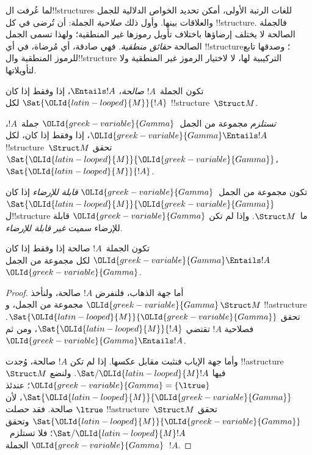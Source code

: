 \documentclass[../../../include/open-logic-section]{subfiles}
\begin{document}

\begin{explain}
لما عُرفت ال!!{structure}s للغات الرتبة الأولى، أمكن تحديد
الخواص الدلالية للجمل والعلاقات بينها. وأول ذلك \emph{صلاحية}
الجملة: أن تُرضى في كل !!{structure}. فالجملة الصالحة لا يختلف
إرضاؤها باختلاف تأويل رموزها غير المنطقية؛ ولهذا تسمى الجمل
الصالحة \emph{حقائق منطقية}. فهي صادقة، أي مُرضاة، في أي
!!{structure}؛ وصدقها تابع للرموز المنطقية وال!!{structure}
التركيبية لها، لا لاختيار الرموز غير المنطقية ولا لتأويلاتها.
\end{explain}

\begin{defn}[الصلاحية]
تكون الجملة~$!A$ \emph{صالحة}، $\Entails !A$، إذا وفقط إذا كان
$\Sat{{\OLId{latin-looped}{M}}}{!A}$ لكل !!{structure}~$\Struct M$.
\end{defn}

\begin{defn}[الاستلزام]
\emph{تستلزم} مجموعة من الجمل~${\OLId{greek-variable}{Gamma}}$ جملة~$!A$،
${\OLId{greek-variable}{Gamma}} \Entails !A$، إذا وفقط إذا كان، لكل
!!{structure}~$\Struct M$ تحقق $\Sat{{\OLId{latin-looped}{M}}}{{\OLId{greek-variable}{Gamma}}}$،
$\Sat{{\OLId{latin-looped}{M}}}{!A}$.
\end{defn}


\begin{defn}
تكون مجموعة من الجمل~${\OLId{greek-variable}{Gamma}}$ \emph{قابلة للإرضاء} إذا كان
$\Sat{{\OLId{latin-looped}{M}}}{{\OLId{greek-variable}{Gamma}}}$ ل!!{structure} ما~$\Struct M$. وإذا لم تكن
${\OLId{greek-variable}{Gamma}}$ قابلة للإرضاء سميت \emph{غير قابلة للإرضاء}.
\end{defn}

\begin{prop}
تكون الجملة~$!A$ صالحة إذا وفقط إذا كان
${\OLId{greek-variable}{Gamma}} \Entails !A$ لكل مجموعة من الجمل~${\OLId{greek-variable}{Gamma}}$.
\end{prop}

\begin{proof}
أما جهة الذهاب، فلنفرض $!A$ صالحة، ولنأخذ ${\OLId{greek-variable}{Gamma}}$ مجموعة من
الجمل، و$\Struct M$ !!a{structure} تحقق
$\Sat{{\OLId{latin-looped}{M}}}{{\OLId{greek-variable}{Gamma}}}$. فصلاحية $!A$ تقتضي $\Sat{{\OLId{latin-looped}{M}}}{!A}$،
ومن ثم ${\OLId{greek-variable}{Gamma}} \Entails !A$.

وأما جهة الإياب فنثبت مقابل عكسها. إذا لم تكن $!A$ صالحة، وُجدت
!!a{structure}~$\Struct M$ فيها $\Sat/{{\OLId{latin-looped}{M}}}{!A}$. ولنضع
${\OLId{greek-variable}{Gamma}} = \{ \ltrue \}$؛ عندئذ $\Sat{{\OLId{latin-looped}{M}}}{{\OLId{greek-variable}{Gamma}}}$، لأن
$\ltrue$ صالحة. فقد حصلت !!a{structure}~$\Struct M$ تحقق
$\Sat{{\OLId{latin-looped}{M}}}{{\OLId{greek-variable}{Gamma}}}$ وتحقق $\Sat/{{\OLId{latin-looped}{M}}}{!A}$؛ فلا تستلزم~${\OLId{greek-variable}{Gamma}}$
الجملة~$!A$.
\end{proof}
\end{document}
